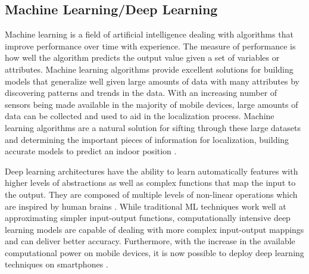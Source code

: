 \subsection{Machine Learning/Deep Learning}
Machine learning is a field of artificial intelligence dealing with algorithms that improve performance over time with experience. The measure of performance is how well the algorithm predicts the output value given a set of variables or attributes. Machine learning algorithms provide excellent solutions for building models that generalize well given large amounts of data with many attributes by discovering patterns and trends in the data. With an increasing number of sensors being made available in the majority of mobile devices, large amounts of data can be collected and used to aid in the localization process. Machine learning algorithms are a natural solution for sifting through these large datasets and determining the important pieces of information for localization, building accurate models to predict an indoor position \cite{ml}.

Deep learning architectures have the ability to learn automatically features with higher levels of abstractions as well as complex functions that map the input to the output. They are composed of multiple levels of non-linear operations which are inspired by human brains \cite{dl}. While traditional ML techniques work well at approximating simpler input-output functions, computationally intensive deep learning models are capable of dealing with more complex input-output mappings and can deliver better accuracy. Furthermore, with the increase in the available computational power on mobile devices, it is now possible to deploy deep learning techniques on smartphones \cite{cnn}.
